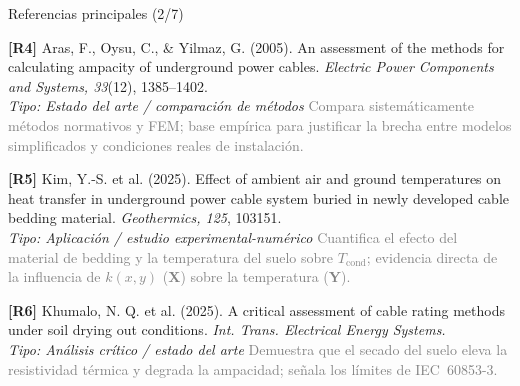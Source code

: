 \documentclass[aspectratio=169]{beamer}
\begin{document}
\begin{frame}{Referencias principales (2/7)}
\small\justifying

\textbf{[R4]} Aras, F., Oysu, C., \& Yilmaz, G. (2005). An assessment of the
methods for calculating ampacity of underground power cables. \textit{Electric
Power Components and Systems, 33}(12), 1385--1402.\\
\textcolor{blue!60!black}{\footnotesize\textit{Tipo: Estado del arte / comparación de métodos}} \quad
\textcolor{gray}{\footnotesize Compara sistemáticamente métodos normativos y FEM;
base empírica para justificar la brecha entre modelos simplificados y
condiciones reales de instalación.}

\medskip
\textbf{[R5]} Kim, Y.-S. et al. (2025). Effect of ambient air and ground
temperatures on heat transfer in underground power cable system buried in newly
developed cable bedding material. \textit{Geothermics, 125}, 103151.\\
\textcolor{blue!60!black}{\footnotesize\textit{Tipo: Aplicación / estudio experimental-numérico}} \quad
\textcolor{gray}{\footnotesize Cuantifica el efecto del material de bedding y la
temperatura del suelo sobre $T_{\text{cond}}$; evidencia directa de la
influencia de $k(x,y)$ (\textbf{X}) sobre la temperatura (\textbf{Y}).}

\medskip
\textbf{[R6]} Khumalo, N. Q. et al. (2025). A critical assessment of cable
rating methods under soil drying out conditions. \textit{Int. Trans. Electrical
Energy Systems.}\\
\textcolor{blue!60!black}{\footnotesize\textit{Tipo: Análisis crítico / estado del arte}} \quad
\textcolor{gray}{\footnotesize Demuestra que el secado del suelo eleva la
resistividad térmica y degrada la ampacidad; señala los límites de IEC~60853-3.}
\end{frame}
\end{document}
